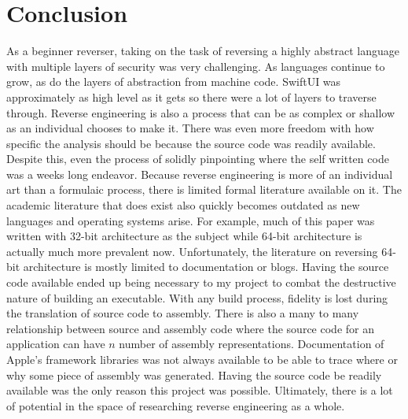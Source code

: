 \documentclass[12pt]{article}
\begin{document}
\section{Conclusion}
As a beginner reverser, taking on the task of reversing a highly abstract language with multiple layers of security was very challenging. As languages continue to grow, as do the layers of abstraction from machine code. SwiftUI was approximately as high level as it gets so there were a lot of layers to traverse through. 
Reverse engineering is also a process that can be as complex or shallow as an individual chooses to make it. There was even more freedom with how specific the analysis should be because the source code was readily available. Despite this, even the process of solidly pinpointing where the self written code was a weeks long endeavor. Because reverse engineering is more of an individual art than a formulaic process, there is limited formal literature available on it. The academic literature that does exist also quickly becomes outdated as new languages and operating systems arise. For example, much of this paper was written with 32-bit architecture as the subject while 64-bit architecture is actually much more prevalent now. Unfortunately, the literature on reversing 64-bit architecture is mostly limited to documentation or blogs.
Having the source code available ended up being necessary to my project to combat the destructive nature of building an executable. With any build process, fidelity is lost during the translation of source code to assembly. There is also a many to many relationship between source and assembly code where the source code for an application can have \(n\) number of assembly representations. Documentation of Apple’s framework libraries was not always available to be able to trace where or why some piece of assembly was generated. Having the source code be readily available was the only reason this project was possible. 
Ultimately, there is a lot of potential in the space of researching reverse engineering as a whole. 


\pagebreak
\nocite{*}


\end{document}
